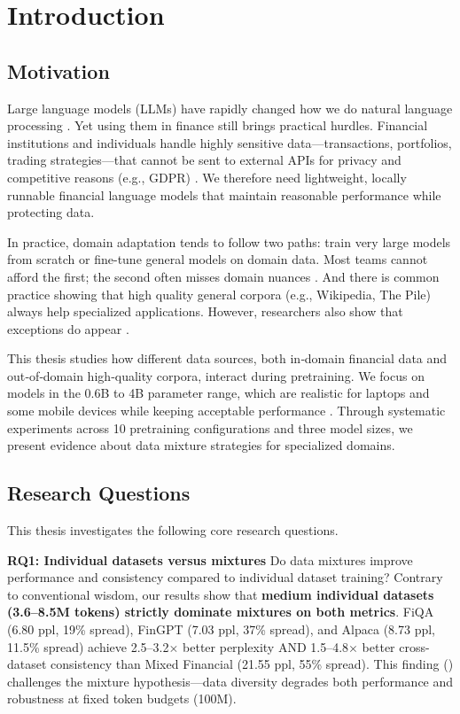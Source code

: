 \chapter{Introduction}

\section{Motivation}

Large language models (LLMs) have rapidly changed how we do natural language processing \parencite{vaswani2017attention,radford2019language,brown2020language,touvron2023llama}. Yet using them in finance still brings practical hurdles. Financial institutions and individuals handle highly sensitive data—transactions, portfolios, trading strategies—that cannot be sent to external APIs for privacy and competitive reasons (e.g., GDPR) \parencite{eu2016gdpr}. We therefore need lightweight, locally runnable financial language models that maintain reasonable performance while protecting data.

In practice, domain adaptation tends to follow two paths: train very large models from scratch or fine-tune general models on domain data. Most teams cannot afford the first; the second often misses domain nuances \parencite{gururangan2020don}. And there is common practice showing that high quality general corpora (e.g., Wikipedia, The Pile) always help specialized applications. However, researchers also show that exceptions do appear \parencite{gao2020pile,raffel2020exploring,longpre2023pretrainer}.

This thesis studies how different data sources, both in‑domain financial data and out‑of‑domain high‑quality corpora, interact during pretraining. We focus on models in the 0.6B to 4B parameter range, which are realistic for laptops and some mobile devices while keeping acceptable performance \parencite{yang2024qwen2,xia2023sheared,team2024gemma,javaheripi2023phi}. Through systematic experiments across 10 pretraining configurations and three model sizes, we present evidence about data mixture strategies for specialized domains.

\section{Research Questions}

This thesis investigates the following core research questions.

\textbf{RQ1: Individual datasets versus mixtures}
Do data mixtures improve performance and consistency compared to individual dataset training? Contrary to conventional wisdom, our results show that \textbf{medium individual datasets (3.6–8.5M tokens) strictly dominate mixtures on both metrics}. FiQA (6.80 ppl, 19\% spread), FinGPT (7.03 ppl, 37\% spread), and Alpaca (8.73 ppl, 11.5\% spread) achieve 2.5–3.2$\times$ better perplexity AND 1.5–4.8$\times$ better cross-dataset consistency than Mixed Financial (21.55 ppl, 55\% spread). This finding () challenges the mixture hypothesis—data diversity degrades both performance and robustness at fixed token budgets (100M).

